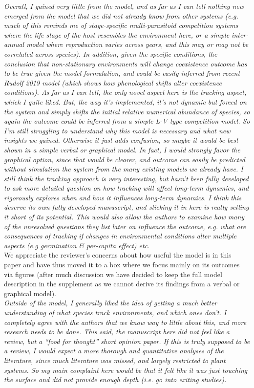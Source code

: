 \documentclass[11pt]{article}
\begin{document}
\emph{Overall, I gained very little from the model, and as far as I can tell nothing new emerged
from the model that we did not already know from other systems (e.g.  much of this reminds me
of stage-specific multi-parasitoid competition systems where the life stage of the host
resembles the environment here, or a simple inter-annual model where reproduction varies
across years, and this may or may not be correlated across species). In addition, given the
specific conditions, the conclusion that non-stationary environments will change coexistence
outcome has to be true given the model formulation, and could be easily inferred from recent
Rudolf 2019 model (which shows how phenological shifts alter coexistence conditions).
As far as I can tell, the only novel aspect here is the tracking aspect, which I quite liked.
But, the way it's implemented, it's not dynamic but forced on the system and simply shifts
the initial relative numerical abundance of species, so again the outcome could be inferred
from a simple L-V type competition model. So I'm still struggling to understand why this
model is necessary and what new insights we gained. Otherwise it just adds confusion, so
maybe it would be best shown in a simple verbal or graphical model. In fact, I would strongly
favor the graphical option, since that would be clearer, and outcome can easily be predicted
without simulation the system from the many existing models we already have. I still think
the tracking approach is very interesting, but hasn't been fully developed to ask more
detailed question on how tracking will affect long-term dynamics, and rigorously explores
when and how it influences long-term dynamics. I think this deserve its own fully developed
manuscript, and sticking it in here is really selling it short of its potential. This would
also allow the authors to examine how many of the unresolved questions they list later on
influence the outcome, e.g. what are consequences of tracking if changes in environmental
conditions alter multiple aspects (e.g germination \& per-capita effect) etc.}\\

We appreciate the reviewer's concerns about how useful the model is in this paper and have thus moved it to a box where we focus mainly on its outcomes via figures (after much discussion we have decided to keep the full model description in the supplement as we cannot derive its findings from a verbal or graphical model).\\

\emph{Outside of the model, I generally liked the idea of getting a much better understanding of
what species track environments, and which ones don't. I completely agree with the authors
that we know way to little about this, and more research needs to be done. This said, the
manuscript here did not feel like a review, but a ``food for thought'' short opinion paper. If
this is truly supposed to be a review, I would expect a more thorough and quantitative
analyses of the literature, since much literature was missed, and largely restricted to plant
systems.  So my main complaint here would be that it felt like it was just touching the
surface and did not provide enough depth (i.e. go into exiting studies).}\\
\end{document}
